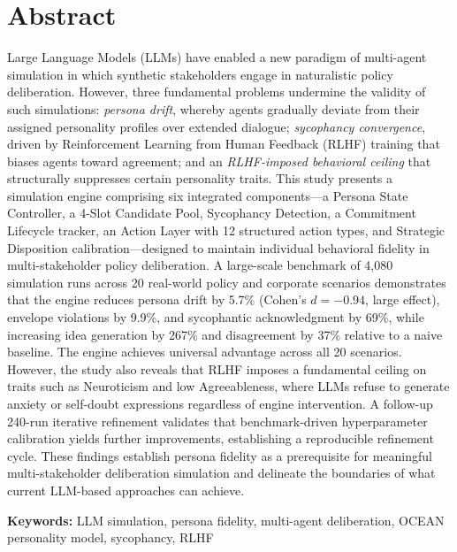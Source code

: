 \chapter*{Abstract}

Large Language Models (LLMs) have enabled a new paradigm of multi-agent simulation in which synthetic stakeholders engage in naturalistic policy deliberation. However, three fundamental problems undermine the validity of such simulations: \textit{persona drift}, whereby agents gradually deviate from their assigned personality profiles over extended dialogue; \textit{sycophancy convergence}, driven by Reinforcement Learning from Human Feedback (RLHF) training that biases agents toward agreement; and an \textit{RLHF-imposed behavioral ceiling} that structurally suppresses certain personality traits. This study presents a simulation engine comprising six integrated components---a Persona State Controller, a 4-Slot Candidate Pool, Sycophancy Detection, a Commitment Lifecycle tracker, an Action Layer with 12 structured action types, and Strategic Disposition calibration---designed to maintain individual behavioral fidelity in multi-stakeholder policy deliberation. A large-scale benchmark of 4,080 simulation runs across 20 real-world policy and corporate scenarios demonstrates that the engine reduces persona drift by 5.7\% (Cohen's $d = -0.94$, large effect), envelope violations by 9.9\%, and sycophantic acknowledgment by 69\%, while increasing idea generation by 267\% and disagreement by 37\% relative to a naive baseline. The engine achieves universal advantage across all 20 scenarios. However, the study also reveals that RLHF imposes a fundamental ceiling on traits such as Neuroticism and low Agreeableness, where LLMs refuse to generate anxiety or self-doubt expressions regardless of engine intervention. A follow-up 240-run iterative refinement validates that benchmark-driven hyperparameter calibration yields further improvements, establishing a reproducible refinement cycle. These findings establish persona fidelity as a prerequisite for meaningful multi-stakeholder deliberation simulation and delineate the boundaries of what current LLM-based approaches can achieve.

\textbf{Keywords:} LLM simulation, persona fidelity, multi-agent deliberation, OCEAN personality model, sycophancy, RLHF
